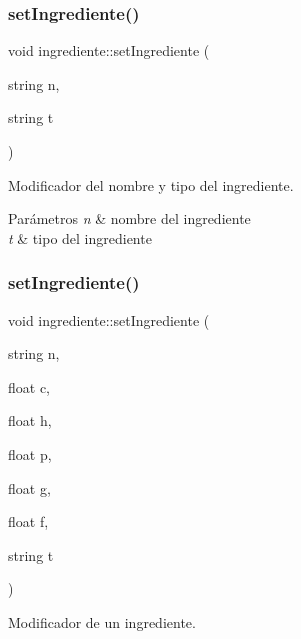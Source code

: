 \subsubsection{\texorpdfstring{set\+Ingrediente()}{setIngrediente()}\hspace{0.1cm}{\footnotesize\ttfamily [1/2]}}
{\footnotesize\ttfamily void ingrediente\+::set\+Ingrediente (\begin{DoxyParamCaption}\item[{string}]{n,  }\item[{string}]{t }\end{DoxyParamCaption})}



Modificador del nombre y tipo del ingrediente. 


\begin{DoxyParams}{Parámetros}
{\em n} & nombre del ingrediente \\
\hline
{\em t} & tipo del ingrediente \\
\hline
\end{DoxyParams}
\mbox{\label{classingrediente_ad55708ee5921247d2060bd2fc54b5f15}} 
\subsubsection{\texorpdfstring{set\+Ingrediente()}{setIngrediente()}\hspace{0.1cm}{\footnotesize\ttfamily [2/2]}}
{\footnotesize\ttfamily void ingrediente\+::set\+Ingrediente (\begin{DoxyParamCaption}\item[{string}]{n,  }\item[{float}]{c,  }\item[{float}]{h,  }\item[{float}]{p,  }\item[{float}]{g,  }\item[{float}]{f,  }\item[{string}]{t }\end{DoxyParamCaption})}



Modificador de un ingrediente. 


